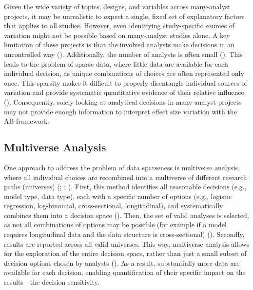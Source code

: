 \documentclass[
  man,
  floatsintext,
  longtable,
  nolmodern,
  notxfonts,
  notimes,
  colorlinks=true,linkcolor=blue,citecolor=blue,urlcolor=blue]{apa7}
\begin{document}
Given the wide variety of topics, designs, and variables across
many-analyst projects, it may be unrealistic to expect a single, fixed
set of explanatory factors that applies to all studies. However, even
identifying study-specific sources of variation might not be possible
based on many-analyst studies alone. A key limitation of these projects
is that the involved analysts make decisions in an uncontrolled way
().
Additionally, the number of analysts is often small
(). This leads to
the problem of sparse data, where little data are available for each
individual decision, as unique combinations of choices are often
represented only once. This sparsity makes it difficult to properly
disentangle individual sources of variation and provide systematic
quantitative evidence of their relative influence
().
Consequently, solely looking at analytical decisions in many-analyst
projects may not provide enough information to interpret effect size
variation with the AB-framework.

\subsection{Multiverse Analysis}\label{multiverse-analysis}

One approach to address the problem of data sparseness is multiverse
analysis, where all individual choices are recombined into a multiverse
of different research paths (universes)
(;
; ). First, this method identifies all reasonable decisions
(e.g., model type, data type), each with a specific number of options
(e.g., logistic regression, log-binomial, cross-sectional,
longitudinal), and systematically combines them into a decision space
(). Then, the set
of valid analyses is selected, as not all combinations of options may be
possible (for example if a model requires longitudinal data and the data
structure is cross-sectional)
().
Secondly, results are reported across all valid universes. This way,
multiverse analysis allows for the exploration of the entire decision
space, rather than just a small subset of decision options chosen by
analysts (). As a
result, substantially more data are available for each decision,
enabling quantification of their specific impact on the results---the
decision sensitivity.
\end{document}
